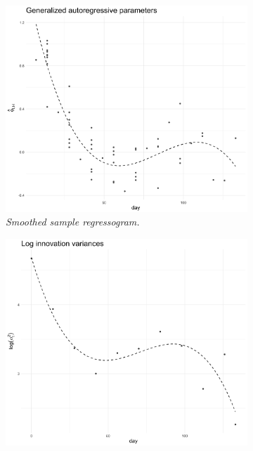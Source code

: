 

\begin{figure}[H]
 \begin{subfigure}{.48\textwidth}
  \centering
\includegraphics[width = \textwidth]{img/cattle/cattleA-regressogram-with-cubic-smooth}
 \caption{\textit{Smoothed sample regressogram.} }
 \label{fig:cattleA-innovariogram-cubic-smooth}
 \end{subfigure}
 \begin{subfigure}{.48\textwidth}
  \centering
\includegraphics[width = \textwidth]{img/cattle/cattleA-innovariogram-with-cubic-smooth}

\end{subfigure}
\end{figure}

